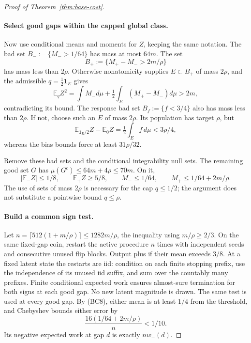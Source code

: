 \documentclass[11pt]{article}
\begin{document}
\begin{proof}[Proof of Theorem~\ref{thm:base-cost}]
\paragraph{Select good gaps within the capped global class.}
Now use conditional means and moments for $Z$, keeping the same notation.
The bad set $B_-:=\{M_->1/64\}$ has mass at most $64m$. The set
\[
                    B_+:=\{M_+-M_->2m/\rho\}
\]
has mass less than $2\rho$. Otherwise nonatomicity supplies
$E\subset B_+$ of mass $2\rho$, and the admissible
$q=\tfrac12\mathbf1_E$ gives
\[
 \mathbb E_qZ^2
 =\int M_-d\mu+\tfrac12\int_E(M_+-M_-)d\mu>2m,
\]
contradicting its bound. The response bad set
$B_f:=\{f<3/4\}$ also has mass less than $2\rho$. If not, choose such
an $E$ of mass $2\rho$. Its population has target $\rho$, but
\[
 \mathbb E_{\mathbf1_E/2}Z-\mathbb E_0Z
       =\tfrac12\int_E f\,d\mu<3\rho/4,
\]
whereas the bias bounds force at least $31\rho/32$.

Remove these bad sets and the conditional integrability null sets. The
remaining good set $G$ has
$\mu(G^c)\le64m+4\rho\le70m$. On it,
\[
 |\mathbb E_-Z|\le1/8,\qquad \mathbb E_+Z\ge5/8,
 \qquad M_-\le1/64,\qquad M_+\le1/64+2m/\rho.           \tag{BC8}
\]
The use of sets of mass $2\rho$ is necessary for the cap $q\le1/2$;
the argument does not substitute a pointwise bound $q\le\rho$.

\paragraph{Build a common sign test.}
Let $n=\lceil512(1+m/\rho)\rceil\le1282m/\rho$, the inequality using
$m/\rho\ge2/3$. On the same fixed-gap coin, restart the active procedure
$n$ times with independent seeds and consecutive unused flip blocks.
Output plus if their mean exceeds $3/8$. At a fixed latent state the
restarts are iid: condition on each finite stopping prefix, use the
independence of its unused iid suffix, and sum over the countably many
prefixes. Finite conditional expected work ensures almost-sure
termination for both signs at each good gap. No new latent magnitude is
drawn. The same test is used at every good gap. By (BC8), either mean is
at least $1/4$ from the threshold, and Chebyshev bounds either error by
\[
                 \frac{16(1/64+2m/\rho)}n<1/10.
\]
Its negative expected work at gap $d$ is exactly $nw_-(d)$.


\end{proof}
\end{document}
